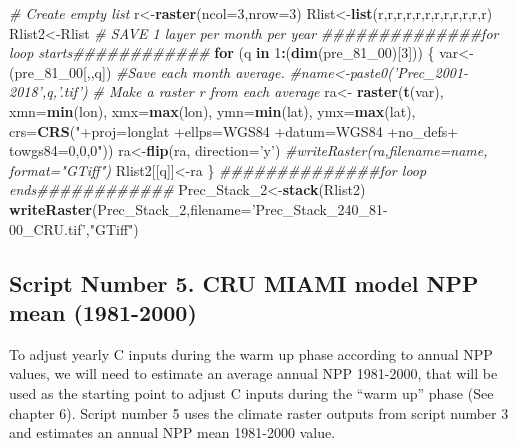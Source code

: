 \documentclass[
  10pt,
  b5paper,
]{book}
\newenvironment{Shaded}{\begin{snugshade}}{\end{snugshade}}
\newcommand{\CommentTok}[1]{\textcolor[rgb]{0.56,0.35,0.01}{\textit{#1}}}
\newcommand{\ControlFlowTok}[1]{\textcolor[rgb]{0.13,0.29,0.53}{\textbf{#1}}}
\newcommand{\DataTypeTok}[1]{\textcolor[rgb]{0.13,0.29,0.53}{#1}}
\newcommand{\DecValTok}[1]{\textcolor[rgb]{0.00,0.00,0.81}{#1}}
\newcommand{\KeywordTok}[1]{\textcolor[rgb]{0.13,0.29,0.53}{\textbf{#1}}}
\newcommand{\NormalTok}[1]{#1}
\newcommand{\OperatorTok}[1]{\textcolor[rgb]{0.81,0.36,0.00}{\textbf{#1}}}
\newcommand{\StringTok}[1]{\textcolor[rgb]{0.31,0.60,0.02}{#1}}
\begin{document}
\begin{Shaded}
\begin{Highlighting}[]
 \CommentTok{# Create empty list}
\NormalTok{r<-}\KeywordTok{raster}\NormalTok{(}\DataTypeTok{ncol=}\DecValTok{3}\NormalTok{,}\DataTypeTok{nrow=}\DecValTok{3}\NormalTok{)}
\NormalTok{Rlist<-}\KeywordTok{list}\NormalTok{(r,r,r,r,r,r,r,r,r,r,r,r)}
\NormalTok{Rlist2<-Rlist}
 \CommentTok{# SAVE 1 layer per month per year}
\CommentTok{##############for loop starts############}
 \ControlFlowTok{for}\NormalTok{ (q }\ControlFlowTok{in} \DecValTok{1}\OperatorTok{:}\NormalTok{(}\KeywordTok{dim}\NormalTok{(pre_}\DecValTok{81}\NormalTok{_}\DecValTok{00}\NormalTok{)[}\DecValTok{3}\NormalTok{])) \{}
\NormalTok{var<-(pre_}\DecValTok{81}\NormalTok{_}\DecValTok{00}\NormalTok{[,,q])}
 \CommentTok{#Save each month average. }
 \CommentTok{#name<-paste0('Prec_2001-2018',q,'.tif')}
 \CommentTok{# Make a raster r from each average}
\NormalTok{ra<-}\StringTok{ }\KeywordTok{raster}\NormalTok{(}\KeywordTok{t}\NormalTok{(var), }\DataTypeTok{xmn=}\KeywordTok{min}\NormalTok{(lon), }\DataTypeTok{xmx=}\KeywordTok{max}\NormalTok{(lon), }\DataTypeTok{ymn=}\KeywordTok{min}\NormalTok{(lat), }\DataTypeTok{ymx=}\KeywordTok{max}\NormalTok{(lat), }\DataTypeTok{crs=}\KeywordTok{CRS}\NormalTok{(}\StringTok{"+proj=longlat +ellps=WGS84 +datum=WGS84 +no_defs+ towgs84=0,0,0"}\NormalTok{))}
\NormalTok{ra<-}\KeywordTok{flip}\NormalTok{(ra, }\DataTypeTok{direction=}\StringTok{'y'}\NormalTok{)}
\CommentTok{#writeRaster(ra,filename=name, format="GTiff")}
\NormalTok{Rlist2[[q]]<-ra}
\NormalTok{\}}
\CommentTok{##############for loop ends############}
\NormalTok{Prec_Stack_}\DecValTok{2}\NormalTok{<-}\KeywordTok{stack}\NormalTok{(Rlist2)}
\KeywordTok{writeRaster}\NormalTok{(Prec_Stack_}\DecValTok{2}\NormalTok{,}\DataTypeTok{filename=}\StringTok{'Prec_Stack_240_81-00_CRU.tif'}\NormalTok{,}\StringTok{"GTiff"}\NormalTok{)}
\end{Highlighting}
\end{Shaded}

\hypertarget{script-number-5.-cru-miami-model-npp-mean-1981-2000}{%
\subsection{Script Number 5. CRU MIAMI model NPP mean (1981-2000)}\label{script-number-5.-cru-miami-model-npp-mean-1981-2000}}

To adjust yearly C inputs during the warm up phase according to annual NPP values, we will need to estimate an average annual NPP 1981-2000, that will be used as the starting point to adjust C inputs during the ``warm up'' phase (See chapter 6). Script number 5 uses the climate raster outputs from script number 3 and estimates an annual NPP mean 1981-2000 value.
\end{document}
